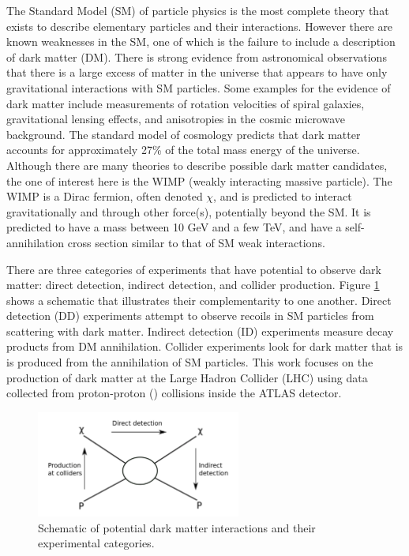 \label{chapter:introduction}

The Standard Model (SM) of particle physics is the most complete theory that exists to describe elementary particles and their interactions. However there are known weaknesses in the SM, one of which is the failure to include a description of dark matter (DM). There is strong evidence from astronomical observations that there is a large excess of matter in the universe that appears to have only gravitational interactions with SM particles. Some examples for the evidence of dark matter include measurements of rotation velocities of spiral galaxies, gravitational lensing effects, and anisotropies in the cosmic microwave background. The standard model of cosmology predicts that dark matter accounts for approximately 27\% of the total mass energy of the universe. Although there are many theories to describe possible dark matter candidates, the one of interest here is the WIMP (weakly interacting massive particle). The WIMP is a Dirac fermion, often denoted $\chi$, and is predicted to interact gravitationally and through other force(s), potentially beyond the SM. It is predicted to have a mass between 10 GeV and a few TeV, and have a self-annihilation cross section similar to that of SM weak interactions.

There are three categories of experiments that have potential to observe dark matter: direct detection, indirect detection, and collider production. Figure \ref{fig:detection} shows a schematic that illustrates their complementarity to one another. Direct detection (DD) experiments attempt to observe recoils in SM particles from scattering with dark matter. Indirect detection (ID) experiments measure decay products from DM annihilation. Collider experiments look for dark matter that is is produced from the annihilation of SM particles. This work focuses on the production of dark matter at the Large Hadron Collider (LHC) using data collected from proton-proton (\pp) collisions inside the ATLAS detector.

\begin{figure}[htb]
\centering
\includegraphics[width=0.6\textwidth]{Figures/detection.png}
\caption{Schematic of potential dark matter interactions and their experimental categories.}
\label{fig:detection}
\end{figure}

